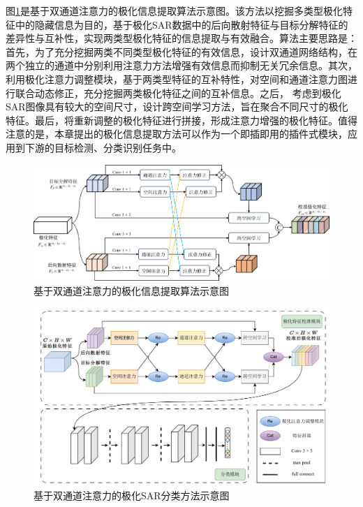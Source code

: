图\ref{DPEN_framework}是基于双通道注意力的极化信息提取算法示意图。该方法以挖掘多类型极化特征中的隐藏信息为目的，基于极化SAR数据中的后向散射特征与目标分解特征的差异性与互补性，实现两类型极化特征的信息提取与有效融合。算法主要思路是：首先，为了充分挖掘两类不同类型极化特征的有效信息，设计双通道网络结构，在两个独立的通道中分别利用注意力方法增强有效信息而抑制无关冗余信息。其次，利用极化注意力调整模块，基于两类型特征的互补特性，对空间和通道注意力图进行联合动态修正，充分挖掘两类极化特征之间的互补信息。之后， 考虑到极化SAR图像具有较大的空间尺寸，设计跨空间学习方法，旨在聚合不同尺寸的极化特征。最后，将重新调整的极化特征进行拼接，形成注意力增强的极化特征。值得注意的是，本章提出的极化信息提取方法可以作为一个即插即用的插件式模块，应用到下游的目标检测、分类识别任务中。

\begin{figure}[ht!]
    \centering
    \includegraphics[width=14cm]{pic/chapter3/DPEN_framework.png}
    \caption{基于双通道注意力的极化信息提取算法示意图}
    \label{DPEN_framework}
\end{figure}

\begin{figure}[ht!]
    \centering
    \includegraphics[width=14cm]{pic/chapter3/基于双通道注意力的极化SAR分类方法.pdf}
    \caption{基于双通道注意力的极化SAR分类方法示意图}
    \label{}
\end{figure}


